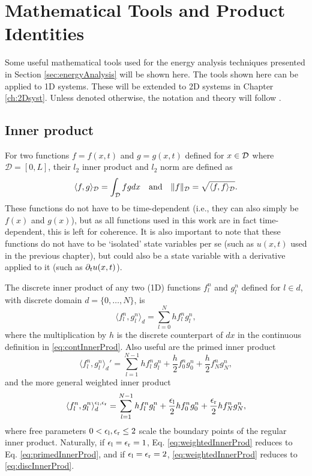 \section{Mathematical Tools and Product Identities}
Some useful mathematical tools used for the energy analysis techniques presented in Section \ref{sec:energyAnalysis} will be shown here. The tools shown here can be applied to 1D systems. These will be extended to 2D systems in Chapter \ref{ch:2Dsyst}. Unless denoted otherwise, the notation and theory will follow \cite{theBible}.

\subsection{Inner product}\label{sec:innerProduct}
For two functions $f = f(x,t)$ and $g = g(x,t)$ defined for $x\in\mathcal{D}$ where $\mathcal{D} = [0,L]$, their $l_2$ inner product and $l_2$ norm are defined as
\begin{equation}\label{eq:contInnerProd}
    \langle f, g\rangle_{\mathcal{D}} = \int_{\mathcal{D}} fg dx \quad \text{and} \quad \lVert f \rVert_{\mathcal{D}} = \sqrt{\langle f, f \rangle_{\mathcal{D}}}.
\end{equation}
These functions do not have to be time-dependent (i.e., they can also simply be $f(x)$ and $g(x)$), but as all functions used in this work are in fact time-dependent, this is left for coherence. It is also important to note that these functions do not have to be `isolated' state variables per se (such as $u(x,t)$ used in the previous chapter), but could also be a state variable with a derivative applied to it (such as $\partial_t u(x,t)$). 

The discrete inner product of any two (1D) functions $f_l^n$ and $g_l^n$ defined for $l \in d$, with discrete domain $d = \{0,\hdots,N\}$, is
\begin{equation}\label{eq:discInnerProd}
    \langle f_l^n, g_l^n \rangle_d = \sum_{l = 0}^N h f_l^n g_l^n,
\end{equation}
where the multiplication by $h$ is the discrete counterpart of $dx$ in the continuous definition in \eqref{eq:contInnerProd}. 
Also useful are the primed inner product
\begin{equation}\label{eq:primedInnerProd}
    \langle f_l^n, g_l^n \rangle_d' = \sum_{l=1}^{N-1} h f_l^n g_l^n + \frac{h}{2}f_0^ng_0^n + \frac{h}{2}f_N^ng_N^n,
\end{equation}
and the more general weighted inner product
\begin{equation}\label{eq:weightedInnerProd}
    \langle f_l^n, g_l^n \rangle_d^{\epsilon_\text{l}, \epsilon_\text{r}} = \sum_{l=1}^{N-1} h f_l^n g_l^n + \frac{\epsilon_\text{l}}{2}hf_0^ng_0^n + \frac{\epsilon_\text{r}}{2}hf_N^ng_N^n,
\end{equation}
where free parameters $0 < \epsilon_\text{l}, \epsilon_\text{r} \leq 2$ scale the boundary points of the regular inner product. Naturally, if $\epsilon_\text{l} = \epsilon_\text{r} = 1$, Eq. \eqref{eq:weightedInnerProd} reduces to Eq. \eqref{eq:primedInnerProd}, and if $\epsilon_\text{l} = \epsilon_\text{r} = 2$, \eqref{eq:weightedInnerProd} reduces to \eqref{eq:discInnerProd}.

